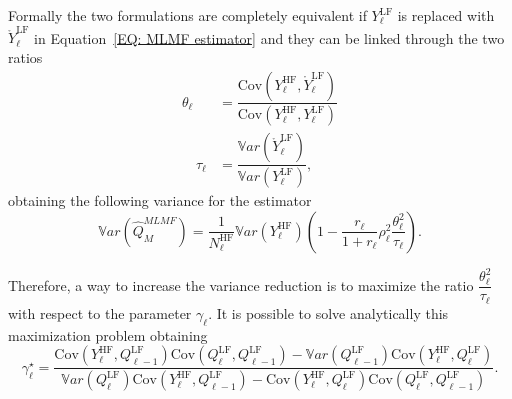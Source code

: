 Formally the two formulations are completely equivalent if $Y_\ell^{\mathrm{LF}}$ is replaced with $\mathring{Y}^{\mathrm{LF}}_{\ell}$ in 
Equation~\eqref{EQ: MLMF estimator} and they can be linked through the two ratios
  \begin{equation}
 \begin{split}
 \theta_{\ell} &= \dfrac{  \mathrm{Cov}\left(  Y^{\mathrm{HF}}_{\ell},\mathring{Y}^{\mathrm{LF}}_{\ell} \right)   }
                        {  \mathrm{Cov}\left( Y^{\mathrm{HF}}_{\ell},Y^{\mathrm{LF}}_{\ell} \right)  } \\
 \quad \tau_{\ell}  &= \dfrac{  \mathbb{V}ar\left(  \mathring{Y}^{\mathrm{LF}}_{\ell} \right)  }{ \mathbb{V}ar\left( Y^{\mathrm{LF}}_{\ell} \right) },
 \end{split}
\end{equation}
obtaining the following variance for the estimator
\begin{equation}
 \mathbb{V}ar\left(\hat{Q}_M^{MLMF} \right) = \dfrac{1}{N_{\ell}^{\mathrm{HF}}} \mathbb{V}ar\left( Y^{\mathrm{HF}}_{\ell} \right) 
 \left( 1 - \dfrac{r_\ell}{1+r_\ell} \rho_\ell^2 \dfrac{\theta_\ell^2}{\tau_\ell} \right).
\end{equation}

Therefore, a way to increase the variance reduction is to maximize the ratio $\dfrac{\theta_\ell^2}{\tau_\ell}$ with respect to the 
parameter $\gamma_\ell$. It is possible to solve analytically this maximization problem obtaining 
\begin{equation}
\gamma_\ell^\star= \dfrac{ \mathrm{Cov}\left(  Y^{\mathrm{HF}}_{\ell},Q_{\ell-1}^{\mathrm{LF}} \right) \mathrm{Cov}\left( Q_{\ell}^{\mathrm{LF}},Q_{\ell-1}^{\mathrm{LF}} \right) 
                   - \mathbb{V}ar\left(Q_{\ell-1}^{\mathrm{LF}}\right) \mathrm{Cov}\left(  Y^{\mathrm{HF}}_{\ell},Q_{\ell}^{\mathrm{LF}} \right) }
            { \mathbb{V}ar\left(Q_{\ell}^{\mathrm{LF}}\right) \mathrm{Cov}\left( Y^{\mathrm{HF}}_{\ell},Q_{\ell-1}^{\mathrm{LF}} \right) 
            - \mathrm{Cov}\left( Y^{\mathrm{HF}}_{\ell},Q_{\ell}^{\mathrm{LF}} \right) \mathrm{Cov}\left( Q_{\ell}^{\mathrm{LF}},Q_{\ell-1}^{\mathrm{LF}} \right) }.
\end{equation}

